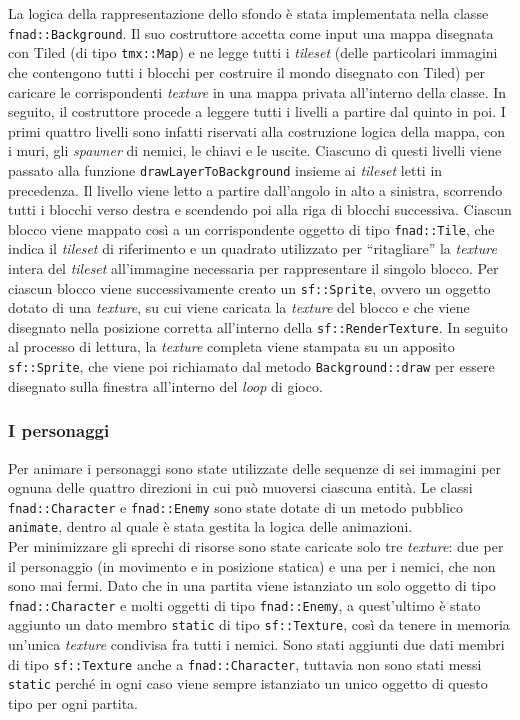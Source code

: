 \documentclass{article}
\newcommand{\quotes}[1]{``#1''}
\begin{document}
La logica della rappresentazione dello sfondo è stata implementata nella classe \verb|fnad::Background|. Il suo costruttore accetta come input una mappa disegnata con Tiled (di tipo \verb|tmx::Map|) e ne legge tutti i \textit{tileset} (delle particolari immagini che contengono tutti i blocchi per costruire il mondo disegnato con Tiled) per caricare le corrispondenti \textit{texture} in una mappa privata all'interno della classe. In seguito, il costruttore procede a leggere tutti i livelli a partire dal quinto in poi. I primi quattro livelli sono infatti riservati alla costruzione logica della mappa, con i muri, gli \textit{spawner} di nemici, le chiavi e le uscite. Ciascuno di questi livelli viene passato alla funzione \verb|drawLayerToBackground| insieme ai \textit{tileset} letti in precedenza. Il livello viene letto a partire dall'angolo in alto a sinistra, scorrendo tutti i blocchi verso destra e scendendo poi alla riga di blocchi successiva. Ciascun blocco viene mappato così a un corrispondente oggetto di tipo \verb|fnad::Tile|, che indica il \textit{tileset} di riferimento e un quadrato utilizzato per \quotes{ritagliare} la \textit{texture} intera del \textit{tileset} all'immagine necessaria per rappresentare il singolo blocco. Per ciascun blocco viene successivamente creato un \verb|sf::Sprite|, ovvero un oggetto dotato di una \textit{texture}, su cui viene caricata la \textit{texture} del blocco e che viene disegnato nella posizione corretta all'interno della \verb|sf::RenderTexture|. In seguito al processo di lettura, la \textit{texture} completa viene stampata su un apposito \verb|sf::Sprite|, che viene poi richiamato dal metodo \verb|Background::draw| per essere disegnato sulla finestra all'interno del \textit{loop} di gioco.

\subsubsection{I personaggi}
Per animare i personaggi sono state utilizzate delle sequenze di sei immagini per ognuna delle quattro direzioni in cui può muoversi ciascuna entità. Le classi \verb|fnad::Character| e \verb|fnad::Enemy| sono state dotate di un metodo pubblico \verb|animate|, dentro al quale è stata gestita la logica delle animazioni.\\
Per minimizzare gli sprechi di risorse sono state caricate solo tre \textit{texture}: due per il personaggio (in movimento e in posizione statica) e una per i nemici, che non sono mai fermi. Dato che in una partita viene istanziato un solo oggetto di tipo \verb|fnad::Character| e molti oggetti di tipo \verb|fnad::Enemy|, a quest'ultimo è stato aggiunto un dato membro \verb|static| di tipo \verb|sf::Texture|, così da tenere in memoria un'unica \textit{texture} condivisa fra tutti i nemici. Sono stati aggiunti due dati membri di tipo \verb|sf::Texture| anche a \verb|fnad::Character|, tuttavia non sono stati messi \verb|static| perché in ogni caso viene sempre istanziato un unico oggetto di questo tipo per ogni partita.
\end{document}

